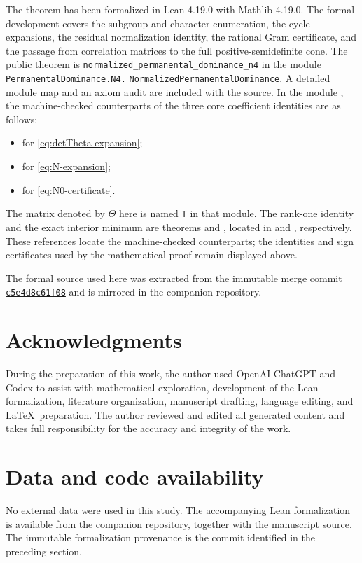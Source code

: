 \documentclass[10pt,twoside]{siamart1116}
\begin{document}
The theorem has been formalized in Lean 4.19.0 with Mathlib 4.19.0.  The
formal development covers the subgroup and character enumeration, the cycle
expansions, the residual normalization identity, the rational Gram
certificate, and the passage from correlation matrices to the full
positive-semidefinite cone.  The public theorem is
\texttt{normalized\_permanental\_dominance\_n4} in the module
\texttt{PermanentalDominance.N4.}\allowbreak
\texttt{NormalizedPermanentalDominance}.
A detailed module map and an axiom audit are included with the source.  In
the module , the machine-checked counterparts of
the three core coefficient identities are as follows:
\begin{itemize}
\item {} for
      \eqref{eq:detTheta-expansion};
\item {} for \eqref{eq:N-expansion};
\item {} for
      \eqref{eq:N0-certificate}.
\end{itemize}
The matrix denoted by $\Theta$ here is named \texttt{T} in that module.  The
rank-one identity and the exact interior minimum are theorems
 and , located
in  and , respectively.
These references locate the machine-checked counterparts; the identities
and sign certificates used by the mathematical proof remain displayed
above.

The formal source used here was extracted from the immutable merge commit
\href{https://github.com/EndlessLethe/math/commit/c5e4d8c61f08d05ffe7c28bfa1ea732d8827b485}
{\texttt{c5e4d8c61f08}} and is mirrored in the companion repository.

\section*{Acknowledgments}
During the preparation of this work, the author used OpenAI ChatGPT and Codex
to assist with mathematical exploration, development of the Lean
formalization, literature organization, manuscript drafting, language
editing, and \LaTeX\ preparation.  The author reviewed and edited all
generated content and takes full responsibility for the accuracy and
integrity of the work.

\section*{Data and code availability}
No external data were used in this study.  The accompanying Lean
formalization is available from the
\href{https://github.com/EndlessLethe/PermanentalDominanceConjecture}
{companion repository}, together with the manuscript source.  The immutable
formalization provenance is the commit identified in the preceding section.
\end{document}

